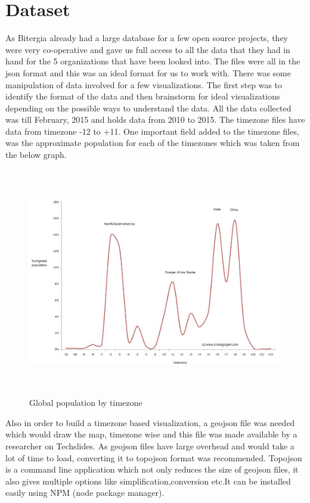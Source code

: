 \documentclass[seploa]{beavtex}
\begin{document}
\section{Dataset}
As Bitergia already had a large database for a few open source projects, they were very co-operative and gave us full access to all the data that they had in hand for the 5 organizations that have been looked into. The files were all in the json format and this was an ideal format for us to work with. There was some manipulation of data involved for a few visualizations. The first step was to identify the format of the data and then brainstorm for ideal visualizations depending on the possible ways to understand the data. All the data collected was till February, 2015 and holds data from 2010 to 2015. The timezone files have data from timezone -12 to +11. One important field added to the timezone files, was the approximate population for each of the timezones which was taken from the below graph.

\begin{figure}[!ht]
\centering
\includegraphics[width=160mm, height=100mm]{pop1.png}
\caption{Global population by timezone}
\end{figure}

Also in order to build a timezone based visualization, a geojson file was needed which would draw the map, timezone wise and this file was made available by a researcher on Techslides. As geojson files have large overhead and would take a lot of time to load, converting it to topojson format was recommended\cite{tech}. Topojson is a command line application which not only reduces the size of geojson files, it also gives multiple options like simplification,conversion etc.It can be installed easily using NPM (node package manager). 
\end{document}

